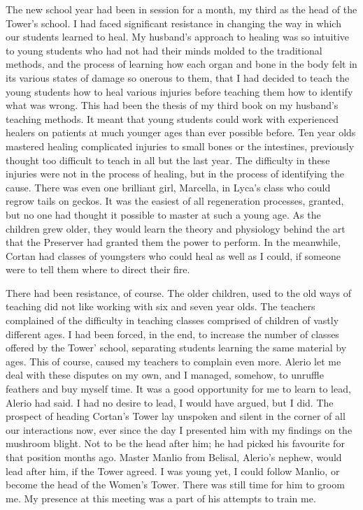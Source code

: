 \documentclass{article}
\begin{document}
The new school year had been in session for a month, my third as the head of the Tower's school. I had faced significant resistance in changing the way in which our students learned to heal. My husband's approach to healing was so intuitive to young students who had not had their minds molded to the traditional methods, and the process of learning how each organ and bone in the body felt in its various states of damage so onerous to them, that I had decided to teach the young students how to heal various injuries before teaching them how to identify what was wrong. This had been the thesis of my third book on my husband's teaching methods. It meant that young students could work with experienced healers on patients at much younger ages than ever possible before. Ten year olds mastered healing complicated injuries to small bones or the intestines, previously thought too difficult to teach in all but the last year. The difficulty in these injuries were not in the process of healing, but in the process of identifying the cause. There was even one brilliant girl, Marcella, in Lyca's class who could regrow tails on geckos. It was the easiest of all regeneration processes, granted, but no one had thought it possible to master at such a young age. As the children grew older, they would learn the theory and physiology behind the art that the Preserver had granted them the power to perform. In the meanwhile, Cortan had classes of youngsters who could heal as well as I could, if someone were to tell them where to direct their fire. 

There had been resistance, of course. The older children, used to the old ways of teaching did not like working with six and seven year olds. The teachers complained of the difficulty in teaching classes comprised of children of vastly different ages. I had been forced, in the end, to increase the number of classes offered by the Tower' school, separating students learning the same material by ages. This of course, caused my teachers to complain even more. Alerio let me deal with these disputes on my own, and I managed, somehow, to unruffle feathers and buy myself time. It was a good opportunity for me to learn to lead, Alerio had said. I had no desire to lead, I would have argued, but I did. The prospect of heading Cortan's Tower lay unspoken and silent in the corner of all our interactions now, ever since the day I presented him with my findings on the mushroom blight. Not to be the head after him; he had picked his favourite for that position months ago. Master Manlio from Belisal, Alerio's nephew, would lead after him, if the Tower agreed. I was young yet, I could follow Manlio, or become the head of the Women's Tower. There was still time for him to groom me. My presence at this meeting was a part of his attempts to train me.
\end{document}
